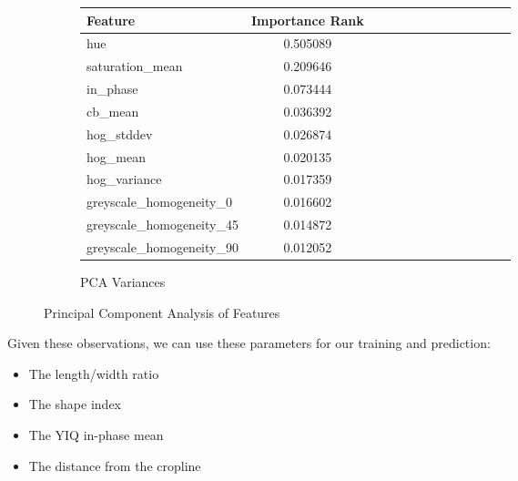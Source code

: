 \documentclass[letterpaper]{article}
\begin{document}
{\begin{figure}[h]
\begin{subfigure}[h]{.32\textwidth}
		{
		\centering\settowidth{}
		\renewcommand\theadalign{cl}\renewcommand\cellalign{cl}
		\renewcommand\theadfont{\bfseries}
		\renewcommand\tabcolsep{4pt}\renewcommand\arraystretch{1.25}
		\footnotesize
		
		\begin{longtable}[c]{
		    |l |*{12}{c |} }%
		    \hline
		    {\textbf{Feature}} & {\textbf{Importance Rank}}\\
		    \hline
			hue                      &     0.505089 \\
			saturation\_mean          &     0.209646 \\
			in\_phase                 &     0.073444 \\
			cb\_mean                  &     0.036392 \\
			hog\_stddev               &     0.026874 \\
			hog\_mean                 &     0.020135 \\
			hog\_variance             &     0.017359 \\
			greyscale\_homogeneity\_0  &     0.016602 \\
			greyscale\_homogeneity\_45 &     0.014872 \\
			greyscale\_homogeneity\_90 &     0.012052 \\	    
		    
		    \hline
		  \end{longtable}
		 }
	  \caption{PCA Variances}
	\end{subfigure}
\caption{Principal Component Analysis of Features}
\label{fig:pca}
\end{figure}




 
  Given these observations, we can use these parameters for our training and prediction:
 \begin{itemize}
	\item{The length/width ratio}
	\item{The shape index}
	\item{The YIQ in-phase mean}
	\item{The distance from the cropline}
\end{itemize}

}
\end{document}
